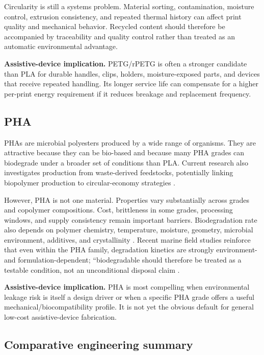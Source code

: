 \documentclass[11pt]{article}
\begin{document}
Circularity is still a systems problem. Material sorting, contamination, moisture control, extrusion consistency, and repeated thermal history can affect print quality and mechanical behavior. Recycled content should therefore be accompanied by traceability and quality control rather than treated as an automatic environmental advantage.

\textbf{Assistive-device implication.} PETG/rPETG is often a stronger candidate than PLA for durable handles, clips, holders, moisture-exposed parts, and devices that receive repeated handling. Its longer service life can compensate for a higher per-print energy requirement if it reduces breakage and replacement frequency.

\subsection{PHA}

PHAs are microbial polyesters produced by a wide range of organisms. They are attractive because they can be bio-based and because many PHA grades can biodegrade under a broader set of conditions than PLA. Current research also investigates production from waste-derived feedstocks, potentially linking biopolymer production to circular-economy strategies \cite{zhou2023,getino2024}.

However, PHA is not one material. Properties vary substantially across grades and copolymer compositions. Cost, brittleness in some grades, processing windows, and supply consistency remain important barriers. Biodegradation rate also depends on polymer chemistry, temperature, moisture, geometry, microbial environment, additives, and crystallinity \cite{zhou2023,dhaini2024,derippe2024,read2024}. Recent marine field studies reinforce that even within the PHA family, degradation kinetics are strongly environment- and formulation-dependent; ``biodegradable should therefore be treated as a testable condition, not an unconditional disposal claim \cite{read2024,derippe2024}.

\textbf{Assistive-device implication.} PHA is most compelling when environmental leakage risk is itself a design driver or when a specific PHA grade offers a useful mechanical/biocompatibility profile. It is not yet the obvious default for general low-cost assistive-device fabrication.

\subsection{Comparative engineering summary}
\end{document}
